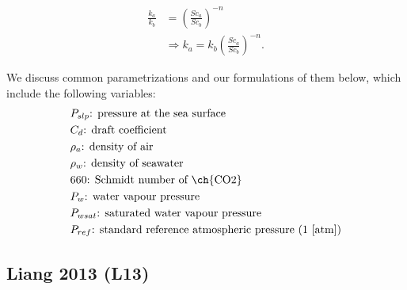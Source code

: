 \documentclass[11pt]{article}
\begin{document}
\begin{align}
	\frac{k_a}{k_b} &= \left(\frac{Sc_a}{Sc_b}\right)^{-n} \\	
			&\Rightarrow k_a = k_b \left(\frac{Sc_a}{Sc_b}\right)^{-n}.
\end{align}
\par
We discuss common parametrizations and our formulations of them below, which include the following variables:
\begin{align*}
	&P_{slp}\text{: pressure at the sea surface} \\
	&C_d\text{: draft coefficient} \\
	&\rho_a\text{: density of air} \\
	&\rho_w\text{: density of seawater} \\
	&660\text{: Schmidt number of \ch{CO2}} \\
	&P_w\text{: water vapour pressure} \\
	&P_{wsat}\text{: saturated water vapour pressure} \\
	&P_{ref}\text{: standard reference atmospheric pressure (1 [atm])}
\end{align*}

\subsection*{Liang 2013 (L13)}
\end{document}
